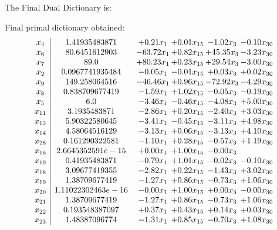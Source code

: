 \documentclass[8pt]{article}
\begin{document}
The Final Dual Dictionary is: 

 Final primal dictionary obtained: 
\[\begin{array}{c| c c@{\hskip 2pt} c@{\hskip 2pt} c@{\hskip 2pt} c@{\hskip 2pt} }
 x_{4}   &  1.41935483871 & +  0.21 x_{1} & +  0.01 x_{15} & -1.02 x_{3} & -0.10 x_{30}\\
 x_{6}   &  80.6451612903 & -63.72 x_{1} & +  0.82 x_{15} & + 45.35 x_{3} & -3.23 x_{30}\\
 x_{7}   &  89.0 & + 80.23 x_{1} & +  0.23 x_{15} & + 29.54 x_{3} & -3.00 x_{30}\\
 x_{2}   &  0.0967741935484 & -0.05 x_{1} & -0.01 x_{15} & +  0.03 x_{3} & +  0.02 x_{30}\\
 x_{9}   &  149.258064516 & -46.46 x_{1} & +  0.96 x_{15} & -72.92 x_{3} & -4.29 x_{30}\\
 x_{8}   &  0.838709677419 & -1.59 x_{1} & +  1.02 x_{15} & -0.05 x_{3} & -0.19 x_{30}\\
 x_{5}   &  6.0 & -3.46 x_{1} & -0.46 x_{15} & -4.08 x_{3} & +  5.00 x_{30}\\
 x_{11}   &  3.1935483871 & -2.86 x_{1} & +  0.20 x_{15} & -2.40 x_{3} & +  3.03 x_{30}\\
 x_{13}   &  5.90322580645 & -3.41 x_{1} & -0.45 x_{15} & -3.11 x_{3} & +  4.98 x_{30}\\
 x_{14}   &  4.58064516129 & -3.13 x_{1} & +  0.06 x_{15} & -3.13 x_{3} & +  4.10 x_{30}\\
 x_{28}   &  0.161290322581 & -1.10 x_{1} & +  0.28 x_{15} & -0.57 x_{3} & +  1.19 x_{30}\\
 x_{16}   &  2.6645352591e-15 & +  0.00 x_{1} & +  1.00 x_{15} & -0.00 x_{3} &   \\
 x_{10}   &  0.41935483871 & -0.79 x_{1} & +  1.01 x_{15} & -0.02 x_{3} & -0.10 x_{30}\\
 x_{18}   &  3.09677419355 & -2.82 x_{1} & +  0.22 x_{15} & -1.43 x_{3} & +  3.02 x_{30}\\
 x_{19}   &  1.38709677419 & -1.27 x_{1} & +  0.86 x_{15} & -0.73 x_{3} & +  1.06 x_{30}\\
 x_{20}   &  1.11022302463e-16 & -0.00 x_{1} & +  1.00 x_{15} & +  0.00 x_{3} & -0.00 x_{30}\\
 x_{21}   &  1.38709677419 & -1.27 x_{1} & +  0.86 x_{15} & -0.73 x_{3} & +  1.06 x_{30}\\
 x_{22}   &  0.193548387097 & +  0.37 x_{1} & +  0.43 x_{15} & +  0.14 x_{3} & +  0.03 x_{30}\\
 x_{23}   &  1.48387096774 & -1.31 x_{1} & +  0.85 x_{15} & -0.70 x_{3} & +  1.08 x_{30}\\

\end{array}\]
\end{document}
